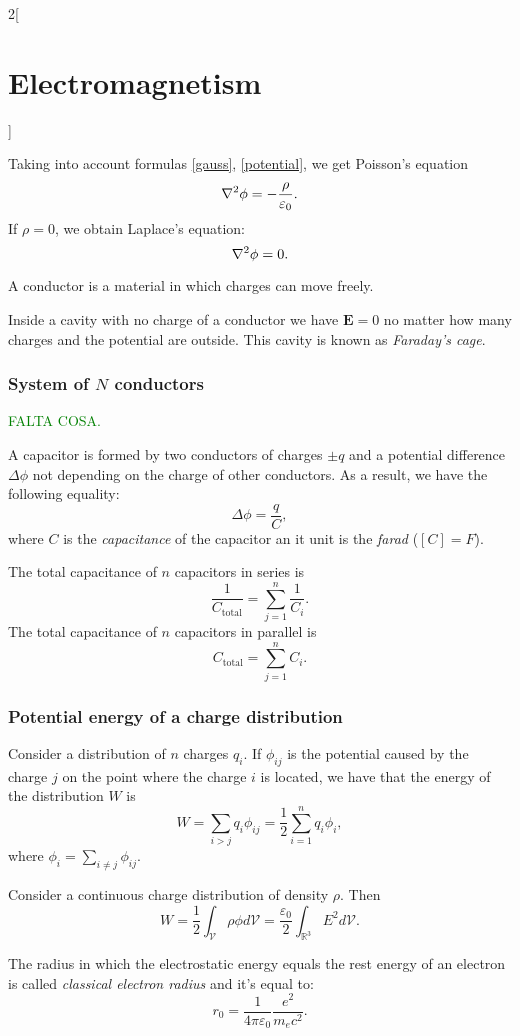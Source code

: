 \documentclass[../../../main.tex]{subfiles}
\begin{document}
\begin{multicols}{2}[\section{Electromagnetism}]
\begin{concept}
    Taking into account formulas \ref{gauss}, \ref{potential}, we get Poisson's equation $$\laplacian\phi=-\frac{\rho}{\varepsilon_0}.$$ If $\rho=0$, we obtain Laplace's equation: $$\laplacian\phi=0.$$
  \end{concept}
  \begin{definition}
    A conductor is a material in which charges can move freely.
  \end{definition}
  \begin{concept}
    Inside a cavity with no charge of a conductor we have $\boldsymbol{E}=0$ no matter how many charges and the potential are outside. This cavity is known as \textit{Faraday's cage}.
  \end{concept}
  \subsubsection{System of $N$ conductors}
  \textcolor{green}{FALTA COSA.}
  \begin{definition}[Capacitor]
    A capacitor is formed by two conductors of charges $\pm q$ and a potential difference $\Delta\phi$ not depending on the charge of other conductors. As a result, we have the following equality: $$\Delta\phi=\frac{q}{C},$$ where $C$ is the \textit{capacitance} of the capacitor an it unit is the \textit{farad} ($[C]=F$).
  \end{definition}
  \begin{concept}
    The total capacitance of $n$ capacitors in series is $$\frac{1}{C_\text{total}}=\sum_{j=1}^n\frac{1}{C_i}.$$
    The total capacitance of $n$ capacitors in parallel is $$C_\text{total}=\sum_{j=1}^nC_i.$$
  \end{concept}
  \subsubsection{Potential energy of a charge distribution}
  \begin{concept}
    Consider a distribution of $n$ charges $q_i$. If $\phi_{ij}$ is the potential caused by the charge $j$ on the point where the charge $i$ is located, we have that the energy of the distribution $W$ is $$W=\sum_{i>j}q_i\phi_{ij}=\frac{1}{2}\sum_{i=1}^nq_i\phi_i,$$ where $\displaystyle\phi_i=\sum_{i\ne j}\phi_{ij}$.
  \end{concept}
  \begin{concept}
    Consider a continuous charge distribution of density $\rho$. Then $$W=\frac{1}{2}\int_\mathcal{V}\rho\phi d\mathcal{V}=\frac{\varepsilon_0}{2}\int_{\mathbb{R}^3}E^2d\mathcal{V}.$$
  \end{concept}
  \begin{definition}
    The radius in which the electrostatic energy equals the rest energy of an electron is called \textit{classical electron radius} and it's equal to: $$r_0=\frac{1}{4\pi\varepsilon_0}\frac{e^2}{m_ec^2}.$$
  \end{definition}
\end{multicols}
\end{document}
